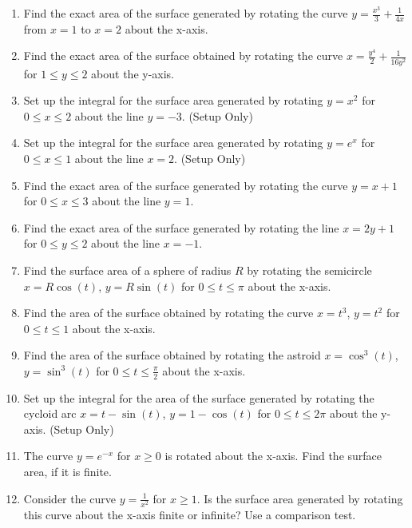\documentclass{article}
\begin{document}
\begin{enumerate}
    \item Find the exact area of the surface generated by rotating the curve $y=\frac{x^3}{3} + \frac{1}{4x}$ from $x=1$ to $x=2$ about the x-axis.
    
    \item Find the exact area of the surface obtained by rotating the curve $x = \frac{y^4}{2} + \frac{1}{16y^2}$ for $1 \le y \le 2$ about the y-axis.

    \item Set up the integral for the surface area generated by rotating $y = x^2$ for $0 \le x \le 2$ about the line $y = -3$. (Setup Only)

    \item Set up the integral for the surface area generated by rotating $y = e^x$ for $0 \le x \le 1$ about the line $x = 2$. (Setup Only)

    \item Find the exact area of the surface generated by rotating the curve $y = x+1$ for $0 \le x \le 3$ about the line $y=1$.

    \item Find the exact area of the surface generated by rotating the line $x=2y+1$ for $0 \le y \le 2$ about the line $x=-1$.

    \item Find the surface area of a sphere of radius $R$ by rotating the semicircle $x = R\cos(t)$, $y = R\sin(t)$ for $0 \le t \le \pi$ about the x-axis.

    \item Find the area of the surface obtained by rotating the curve $x=t^3$, $y=t^2$ for $0 \le t \le 1$ about the x-axis.

    \item Find the area of the surface obtained by rotating the astroid $x = \cos^3(t)$, $y = \sin^3(t)$ for $0 \le t \le \frac{\pi}{2}$ about the x-axis.

    \item Set up the integral for the area of the surface generated by rotating the cycloid arc $x = t - \sin(t)$, $y = 1 - \cos(t)$ for $0 \le t \le 2\pi$ about the y-axis. (Setup Only)

    \item The curve $y = e^{-x}$ for $x \ge 0$ is rotated about the x-axis. Find the surface area, if it is finite.

    \item Consider the curve $y = \frac{1}{x^2}$ for $x \ge 1$. Is the surface area generated by rotating this curve about the x-axis finite or infinite? Use a comparison test.


\end{enumerate}
\end{document}
